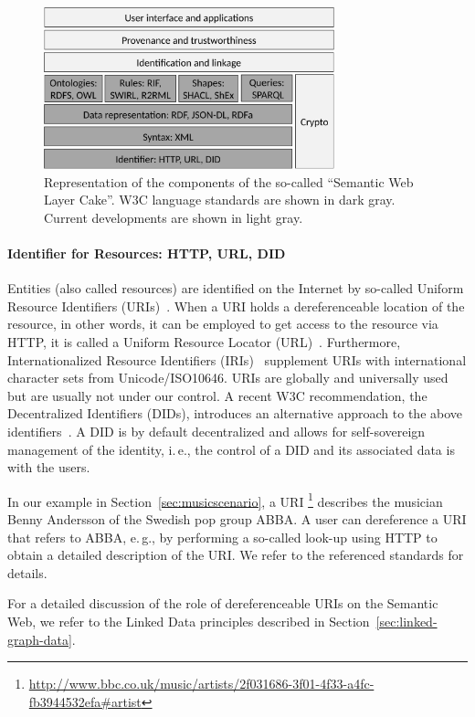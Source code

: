 \documentclass[a4paper,USenglish]{tgdk-v2021}
\begin{document}
\begin{figure}[ht]
  \centering
 \includegraphics[width=0.75\textwidth]{figs/layer-cake-en-cropped.pdf}
 \caption{Representation of the components of the so-called ``Semantic Web Layer Cake''. W3C language standards are shown in dark gray. Current developments are shown in light gray.}
  \label{fig:layercake}
\end{figure}
 
\paragraph*{Identifier for Resources: HTTP, URL, DID}
Entities (also called resources) are identified on the Internet by so-called Uniform Resource Identifiers (URIs)~\cite{rfc1630}.
When a URI holds a dereferenceable location of the resource, in other words, it can be employed to get access to the resource via HTTP, it is called a Uniform Resource Locator (URL)~\cite{rfc1738,rfc3986}.
Furthermore, Internationalized Resource Identifiers (IRIs)~\cite{rfc3987} supplement URIs with international character sets from Unicode/ISO10646.
URIs are globally and universally used but are usually not under our control.
A recent W3C recommendation, the Decentralized Identifiers (DIDs), introduces an alternative approach to the above identifiers~\cite{w3c-did}.
A DID is by default decentralized and allows for self-sovereign management of the identity, i.\,e., the control of a DID and its associated data is with the users.

In our example in Section~\ref{sec:musicscenario}, a URI \footnote{\url{http://www.bbc.co.uk/music/artists/2f031686-3f01-4f33-a4fc-fb3944532efa#artist}} describes the musician Benny Andersson of the Swedish pop group ABBA.
A user can dereference a URI that refers to ABBA, e.\,g., by performing a so-called look-up using HTTP to obtain a detailed description of the URI.
We refer to the referenced standards for details.

For a detailed discussion of the role of dereferenceable URIs on the Semantic Web, we refer to the Linked Data principles described in Section~\ref{sec:linked-graph-data}.
 
\end{document}
